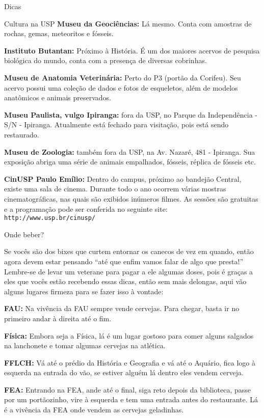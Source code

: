 \begin{secao}{Dicas}
\begin{subsecao}{Cultura na USP}
{\bf Museu da Geociências:} Lá mesmo. Conta com amostras de rochas, gemas, meteoritos 
e fósseis.

{\bf Instituto Butantan:} Próximo à História. É um dos maiores acervos de pesquisa
biológica do mundo, conta com a presença de diversas cobrinhas.

{\bf Museu de Anatomia Veterinária:} Perto do P3 (portão da Corifeu). Seu acervo possui
uma coleção de dados e fotos de esqueletos, além de modelos anatômicos e animais
preservados.

{\bf Museu Paulista, vulgo Ipiranga:} fora da USP, no Parque da
Independência - S/N  - Ipiranga. Atualmente está fechado para visitação,
pois está sendo restaurado.

{\bf Museu de Zoologia:} também fora da USP, na Av. Nazaré, 481  -
Ipiranga. Sua exposição abriga uma série de animais empalhados, fósseis,
réplica de fósseis etc.

{\bf CinUSP Paulo Emílio:} Dentro do campus, próximo ao bandejão Central, existe uma sala de cinema. Durante todo o ano ocorrem várias mostras cinematográficas, nas quais são exibidos inúmeros filmes. As sessões são gratuitas e a programação pode ser conferida no seguinte site: {\tt http://www.usp.br/cinusp/}


\end{subsecao}

\begin{subsecao}{Onde beber?}

Se vocês são dos bixes que curtem entornar os canecos de vez em quando, então
agora devem estar pensando ``até que enfim vamos falar de algo que presta!''
Lembre-se de levar um veterane para pagar a ele algumas doses, pois é graças a
eles que vocês estão recebendo essas dicas, então sem mais delongas, aqui vão
alguns lugares firmeza para se fazer isso à vontade:

{\bf FAU:} Na vivência da FAU sempre vende cervejas. Para chegar, basta ir no 
primeiro andar à direita até o fim.

{\bf Física:} Embora seja a Física, lá é um lugar gostoso para comer alguns
salgados na lanchonete e tomar algumas cervejas na atlética.

{\bf FFLCH:} Vá até o prédio da História e Geografia e vá até o Aquário, fica 
logo à esquerda na entrada do vão, se estiver alguém lá dentro eles vendem cerveja.

{\bf FEA:} Entrando na FEA, ande até o final, siga reto depois da biblioteca,
passe por um portãozinho, vire à esquerda e tem uma entrada antes do restaurante.
Lá é a vivência da FEA onde vendem as cervejas geladinhas.


\end{subsecao}
\end{secao}
